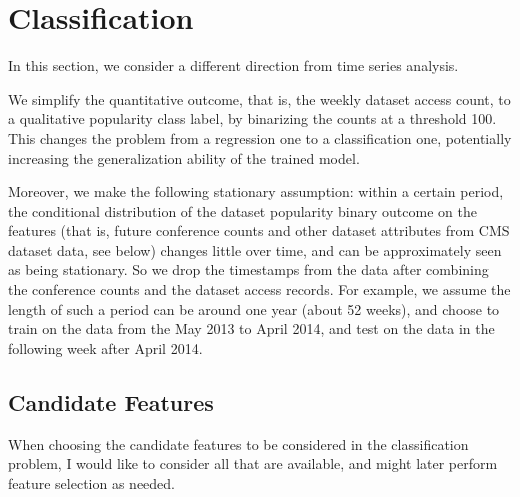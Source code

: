 \documentclass[preprint, 12pt]{elsarticle}
\begin{document}
\section{Classification}

In this section, we consider a different direction from time series analysis.

We simplify the quantitative outcome, that is, the weekly dataset access count, to a qualitative popularity class label, by binarizing the counts at a threshold 100.
This changes the problem from a regression one to a classification one, potentially increasing the generalization ability of the trained model.

Moreover, we make the following stationary assumption:
within a certain period, the conditional distribution of the dataset popularity binary outcome on the features (that is, future conference counts and other dataset attributes from CMS dataset data, see below) changes little over time, and can be approximately seen as being stationary.
So we drop the timestamps from the data after combining the conference counts and the dataset access records.
For example,
we assume the length of such a period can be around one year (about 52 weeks), and choose to train on the data from the May 2013 to April 2014, and test on the data in the following week after April 2014.

 

\subsection{Candidate Features}

When choosing the candidate features to be considered in the classification problem, I would like to consider all that are available, and might later perform feature selection as needed.
\end{document}
